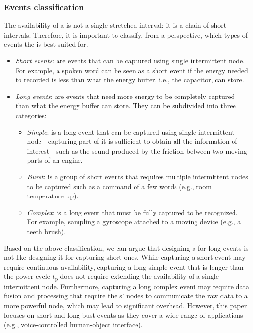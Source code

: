 \subsubsection{Events classification}
\label{sec:event_classification}
The availability of a \sys is not a single stretched interval: it is a chain of short intervals. Therefore, it is important to classify, from a \sys perspective, which types of events the \sys is best suited for. 
%
\begin{itemize}
\item \textit{Short events}: are events that can be captured using single intermittent node. For example, a spoken word can be seen as a short event if the energy needed to recorded is less than what the energy buffer, i.e., the capacitor, can store.
\item \textit{Long events}: are events that need more energy to be completely captured than what the energy buffer can store. They can be subdivided into three categories: 
	\begin{itemize}
		\item \textit{Simple}: is a long event that can be captured using single intermittent node---capturing part of it is sufficient to obtain all the information of interest---such as the sound produced by the friction between two moving parts of an engine. 
		\item \textit{Burst}: is a group of short events that requires multiple intermittent nodes to be captured such as a command of a few words (e.g., room temperature up).
		\item \textit{Complex}: is a long event that must be fully captured to be recognized. For example, sampling a gyroscope attached to a moving device (e.g., a teeth brush).

	\end{itemize}
\end{itemize}

Based on the above classification, we can argue that designing a \sys for long events is not like designing it for capturing short ones. While capturing a short event may require continuous \sys availability, capturing a long simple event that is longer than the power cycle $t_\text{p}$ does not require extending the availability of a single intermittent node. Furthermore, capturing a long complex event may require data fusion and processing that require the \sys{}s' nodes to communicate the raw data to a more powerful node, which may lead to significant overhead. However, this paper focuses on short and long bust events as they cover a wide range of applications (e.g., voice-controlled human-object interface). 

